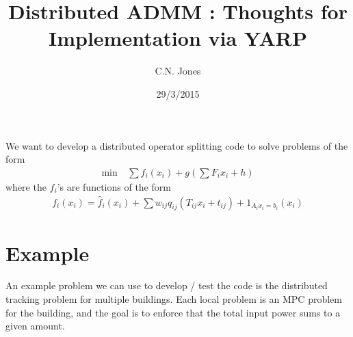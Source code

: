 \documentclass[11pt,a4paper]{article}
\title{Distributed ADMM : Thoughts for Implementation via YARP}
\date{29/3/2015}
\author{C.N. Jones}
\begin{document}
\maketitle

We want to develop a distributed operator splitting code to solve problems of the form
\begin{align}\label{eqn:central}
  \min\ & \sum f_i(x_i) + g\left(\sum F_i x_i + h\right)
\end{align}
where the $f_i$'s are functions of the form
\begin{align*}
f_i(x_i) = \hat f_i(x_i) + \sum w_{ij} q_{ij}(T_{ij}x_i + t_{ij}) + 1_{A_ix_i=b_i}(x_i)
\end{align*}




\section*{Example}
An example problem we can use to develop / test the code is the distributed tracking problem for multiple buildings. Each local problem is an MPC problem for the building, and the goal is to enforce that the total input power sums to a given amount.
\end{document}

